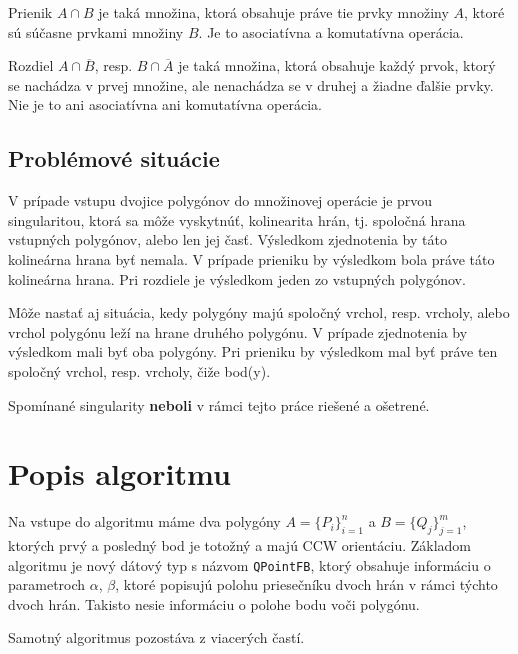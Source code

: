 \documentclass[11pt]{article}
\begin{document}
Prienik $A \cap B$ je taká množina, ktorá obsahuje práve tie prvky množiny $A$, ktoré sú súčasne prvkami množiny $B$. Je to asociatívna a komutatívna operácia.

Rozdiel $A \cap \overline{B}$, resp. $B \cap \overline{A}$ je taká množina, ktorá obsahuje každý prvok, ktorý se nachádza v prvej množine, ale nenachádza se v druhej a žiadne ďalšie prvky. Nie je to ani asociatívna ani komutatívna operácia.



\subsection{Problémové situácie}\label{singularity}
V prípade vstupu dvojice polygónov do množinovej operácie je prvou singularitou, ktorá sa môže vyskytnúť, kolinearita hrán, tj. spoločná hrana vstupných polygónov, alebo len jej časť. Výsledkom zjednotenia by táto kolineárna hrana byť nemala. V prípade prieniku by výsledkom bola práve táto kolineárna hrana. Pri rozdiele je výsledkom jeden zo vstupných polygónov.

Môže nastať aj situácia, kedy polygóny majú spoločný vrchol, resp. vrcholy, alebo vrchol polygónu leží na hrane druhého polygónu. V prípade zjednotenia by výsledkom mali byť oba polygóny. Pri prieniku by výsledkom mal byť práve ten spoločný vrchol, resp. vrcholy, čiže bod(y). 

\noindent Spomínané singularity \textbf{neboli} v rámci tejto práce riešené a ošetrené.


\newpage
\section{Popis algoritmu}
Na vstupe do algoritmu máme dva polygóny $A=\{P_i\}_{i=1}^n$ a $B=\{Q_j\}_{j=1}^m$, ktorých prvý a posledný bod je totožný a majú CCW orientáciu. Základom algoritmu je nový dátový typ s názvom \texttt{QPointFB}, ktorý obsahuje informáciu o parametroch $\alpha$, $\beta$, ktoré popisujú polohu priesečníku dvoch hrán v rámci týchto dvoch hrán. Takisto nesie informáciu o polohe bodu voči polygónu. 

\noindent Samotný algoritmus pozostáva z viacerých častí.
\end{document}
